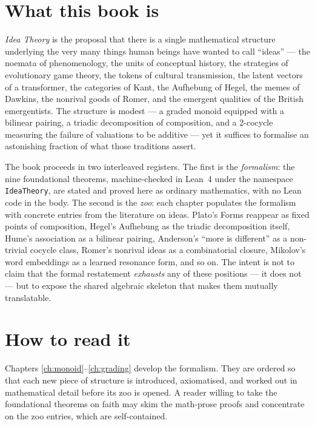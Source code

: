 \section*{What this book is}

\emph{Idea Theory} is the proposal that there is a single mathematical
structure underlying the very many things human beings have wanted to call
``ideas'' --- the noemata of phenomenology, the units of conceptual
history, the strategies of evolutionary game theory, the tokens of cultural
transmission, the latent vectors of a transformer, the categories of Kant,
the Aufhebung of Hegel, the memes of Dawkins, the nonrival goods of Romer,
and the emergent qualities of the British emergentists. The structure is
modest --- a graded monoid equipped with a bilinear pairing, a triadic
decomposition of composition, and a 2-cocycle measuring the failure of
valuations to be additive --- yet it suffices to formalise an astonishing
fraction of what those traditions assert.

The book proceeds in two interleaved registers. The first is the
\emph{formalism}: the nine foundational theorems, machine-checked in
Lean~4 under the namespace \texttt{IdeaTheory}, are stated and proved here
as ordinary mathematics, with no Lean code in the body. The second is the
\emph{zoo}: each chapter populates the formalism with concrete entries
from the literature on ideas. Plato's Forms reappear as fixed points of
composition, Hegel's Aufhebung as the triadic decomposition itself,
Hume's association as a bilinear pairing, Anderson's ``more is different''
as a non-trivial cocycle class, Romer's nonrival ideas as a combinatorial
closure, Mikolov's word embeddings as a learned resonance form, and so
on. The intent is not to claim that the formal restatement \emph{exhausts}
any of these positions --- it does not --- but to expose the shared
algebraic skeleton that makes them mutually translatable.

\section*{How to read it}

Chapters \ref{ch:monoid}--\ref{ch:grading} develop the formalism. They are
ordered so that each new piece of structure is introduced, axiomatised,
and worked out in mathematical detail before its zoo is opened. A reader
willing to take the foundational theorems on faith may skim the
math-prose proofs and concentrate on the zoo entries, which are
self-contained.

